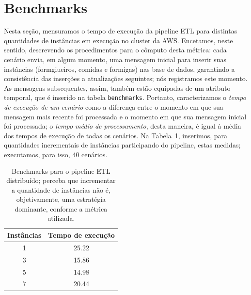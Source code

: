 \documentclass[12pt,oneside,a4paper]{article}
\begin{document}
\appendix 

\section{Benchmarks} 

Nesta seção, mensuramos o tempo de execução da pipeline ETL para distintas quantidades de instâncias em execução no cluster da AWS. Encetamos, neste sentido, descrevendo os procedimentos para o cômputo desta métrica: cada cenário envia, em algum momento, uma mensagem inicial para inserir suas instâncias (formgiueiros, comidas e formigas) nas base de dados, garantindo a consistência das inserções a atualizações seguintes; nós registramos este momento. As mensagens subsequentes, assim, também estão equipadas de um atributo temporal, que é inserido na tabela \texttt{benchmarks}. Portanto, caracterizamos o \textit{tempo de execução de um cenário} como a diferença entre o momento em que sua mensagem mais recente foi processada e o momento em que sua mensagem inicial foi processada; o \textit{tempo médio de processamento}, desta maneira, é igual à média dos tempos de execução de todas os cenários. Na Tabela~\ref{tab:benchmarks}, inserimos, para quantidades incrementais de instâncias participando do pipeline, estas medidas; executamos, para isso, 40 cenários.     

\begin{table} 
	\centering 
	\begin{tabular}{c | c} 
		Instâncias & Tempo de execução \\
		\hline 
		1 & 25.22 \\ 
		3 & 15.86 \\ 
		5 & 14.98 \\ 
		7 & 20.44 \\ 
		\hline 
	\end{tabular}
	\caption{Benchmarks para o pipeline ETL distribuído; perceba que incrementar a quantidade de instâncias não é, objetivamente, uma estratégia dominante, conforme a métrica utilizada.} 
	\label{tab:benchmarks} 
\end{table} 
\end{document}
